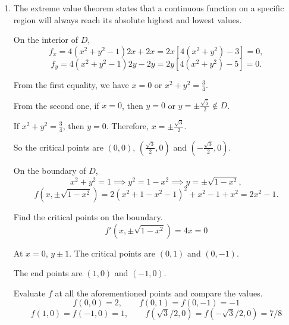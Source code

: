 \documentclass[a4paper, 12pt]{article}
\begin{document}
\begin{enumerate}[leftmargin=*,label=\textbf{\arabic*.}]
Evaluate $D$ at the points.
\[D(0,0)=8>0,\quad f_{yy}(0,0)=2>0\implies (0,0)\text{ is a local minimum.}\]
\[D(1,-1)=-16<0\implies (0,0)\text{ is a saddle point.}\]
\[D(-1,-1)=-16<0\implies (0,0)\text{ is a saddle point.}\]
\[\boxed{(0,0)\text{ is a local minimum. }(1,-1)\text{ and }(-1,-1)\text{ are saddle points.}}\]
\item The extreme value theorem states that a continuous function on a specific region will always reach its absolute highest and lowest values.

On the interior of $D$,
\[f_x=4(x^2+y^2-1)2x+2x=2x\left[4\left(x^2+y^2\right)-3\right]=0,\]
\[f_y=4(x^2+y^2-1)2y-2y= 2y\left[4\left(x^2+y^2\right)-5\right]=0.\]

From the first equality, we have $x=0$ or $x^2+y^2=\frac34$.

From the second one, if $x=0$, then $y=0$ or $y=\pm\frac{\sqrt5}2\notin D$.

If $x^2+y^2=\frac34$, then $y=0$. Therefore, $x=\pm\frac{\sqrt3}2$.

So the critical points are $(0,0)$, $\left(\frac{\sqrt3}2,0\right)$ and $\left(-\frac{\sqrt3}2,0\right)$.

On the boundary of $D$,
\[x^2+y^2=1\implies y^2=1-x^2\implies y=\pm\sqrt{1-x^2},\]
\[f\left(x,\pm \sqrt{1-x^2}\right)=2(x^2+1-x^2-1)^2+x^2-1+x^2=2x^2-1.\]

Find the critical points on the boundary.
\[f'\left(x,\pm\sqrt{1-x^2}\right)=4x=0\]

At $x=0$, $y\pm1$. The critical points are $(0,1)$ and $(0,-1)$.

The end points are $(1,0)$ and $(-1,0)$.

Evaluate $f$ at all the aforementioned points and compare the values.
\[f(0,0)=2,\qquad f(0,1)=f(0,-1)=-1\]
\[f(1,0)=f(-1,0)=1,\qquad f\left(\sqrt3/2, 0\right)=f\left(-\sqrt3/2,0\right)=7/8\]

\end{enumerate}

\newpage
{}
{}


\end{document}
